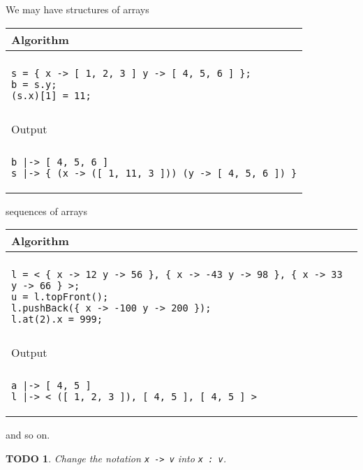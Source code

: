 \documentclass[a4paper]{report}
\newtheorem*{todo}{TODO}
\begin{document}
We may have structures of arrays
\begin{center}
\begin{tabular}{l}
Algorithm\\
\hline
\\
\begin{minipage}{.65\textwidth}
\begin{verbatim}
s = { x -> [ 1, 2, 3 ] y -> [ 4, 5, 6 ] }; 
b = s.y;
(s.x)[1] = 11;
\end{verbatim}
\end{minipage}
\\
\\
Output\\
\hline
\\
\begin{minipage}{.65\textwidth}
\begin{verbatim}
b |-> [ 4, 5, 6 ]
s |-> { (x -> ([ 1, 11, 3 ])) (y -> [ 4, 5, 6 ]) }
\end{verbatim}
\end{minipage}
\end{tabular}
\end{center}
sequences of arrays
\begin{center}
\begin{tabular}{l}
Algorithm \\
\hline
\\
\begin{minipage}{.85\textwidth}
\begin{verbatim}
l = < { x -> 12 y -> 56 }, { x -> -43 y -> 98 }, { x -> 33 y -> 66 } >; 
u = l.topFront();
l.pushBack({ x -> -100 y -> 200 });
l.at(2).x = 999;
\end{verbatim}
\end{minipage}
\\
\\
Output\\
\hline
\\
\begin{minipage}{.85\textwidth}
\begin{verbatim}
a |-> [ 4, 5 ]
l |-> < ([ 1, 2, 3 ]), [ 4, 5 ], [ 4, 5 ] >
\end{verbatim}
\end{minipage}
\end{tabular}
\end{center}
and so on.

\begin{todo}
Change the notation \verb'x -> v' into \verb'x : v'.
\end{todo}
\end{document}
